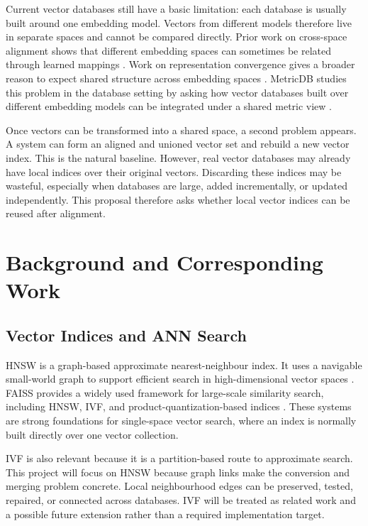 \documentclass[11pt]{article}
\begin{document}
Current vector databases still have a basic limitation: each database is usually built around one embedding model. Vectors from different models therefore live in separate spaces and cannot be compared directly. Prior work on cross-space alignment shows that different embedding spaces can sometimes be related through learned mappings \cite{conneau2018word}. Work on representation convergence gives a broader reason to expect shared structure across embedding spaces \cite{huh2024platonic}. MetricDB studies this problem in the database setting by asking how vector databases built over different embedding models can be integrated under a shared metric view \cite{yang2025integrating}.

Once vectors can be transformed into a shared space, a second problem appears. A system can form an aligned and unioned vector set and rebuild a new vector index. This is the natural baseline. However, real vector databases may already have local indices over their original vectors. Discarding these indices may be wasteful, especially when databases are large, added incrementally, or updated independently. This proposal therefore asks whether local vector indices can be reused after alignment.

\section{Background and Corresponding Work}

\subsection{Vector Indices and ANN Search}

HNSW is a graph-based approximate nearest-neighbour index. It uses a navigable small-world graph to support efficient search in high-dimensional vector spaces \cite{malkov2018hnsw}. FAISS provides a widely used framework for large-scale similarity search, including HNSW, IVF, and product-quantization-based indices \cite{johnson2017faiss}. These systems are strong foundations for single-space vector search, where an index is normally built directly over one vector collection.

IVF is also relevant because it is a partition-based route to approximate search. This project will focus on HNSW because graph links make the conversion and merging problem concrete. Local neighbourhood edges can be preserved, tested, repaired, or connected across databases. IVF will be treated as related work and a possible future extension rather than a required implementation target.
\end{document}
